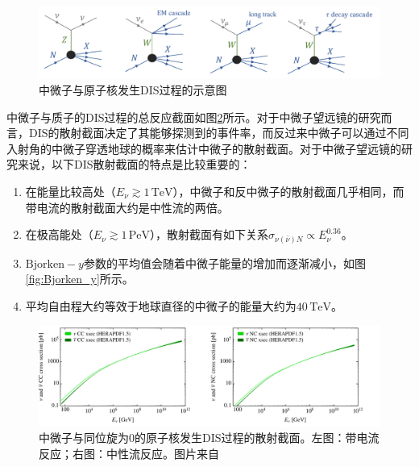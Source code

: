 \begin{figure}[htb]
    \centering
    \includegraphics[width=0.95\linewidth]{img/DIS_types.pdf}
    \caption{中微子与原子核发生DIS过程的示意图}
    \label{fig:DIS_types}
\end{figure}

中微子与质子的DIS过程的总反应截面如图\ref{fig:DIS_cross_section}所示。对于中微子望远镜的研究而言，DIS的散射截面决定了其能够探测到的事件率，而反过来中微子可以通过不同入射角的中微子穿透地球的概率来估计中微子的散射截面\cite{IceCube_cross_section:2020}。对于中微子望远镜的研究来说，以下DIS散射截面的特点是比较重要的：
\begin{enumerate}
    \item 在能量比较高处（$E_\nu \gtrsim 1 \,\mathrm{TeV}$），中微子和反中微子的散射截面几乎相同，而带电流的散射截面大约是中性流的两倍。
    \item 在极高能处（$E_\nu \gtrsim 1 \,\mathrm{PeV}$），散射截面有如下关系$\sigma_{\nu(\bar{\nu})N} \propto E_\nu^{0.36}$。
    \item $\mathrm{Bjorken}-y$参数的平均值会随着中微子能量的增加而逐渐减小，如图\ref{fig:Bjorken_y}所示。
    \item 平均自由程大约等效于地球直径的中微子的能量大约为$40\,\mathrm{TeV}$。
\end{enumerate}

\begin{figure}[htb]
    \centering
    \includegraphics[width=0.95\linewidth]{img/DIS_cross_section.pdf}
    \caption{中微子与同位旋为0的原子核发生DIS过程的散射截面。左图：带电流反应；右图：中性流反应。图片来自\parencite{Sarkar_DIS:2011}}
    \label{fig:DIS_cross_section}
\end{figure}


